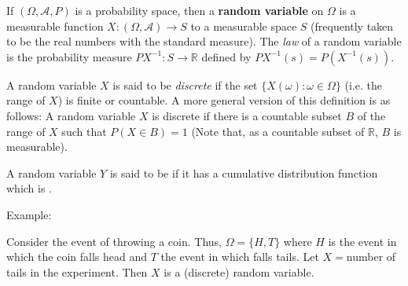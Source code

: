 \documentclass{article}
\newcommand{\mc}{\mathcal}
\newcommand{\mb}{\mathbb}
\newcommand{\R}{\mb{R}}
\newcommand{\<}{\langle}
\renewcommand{\>}{\rangle}
\begin{document}
If $(\Omega,\mc{A},P)$ is a probability space, then a \textbf{random variable} on $\Omega$ is a measurable function $X: (\Omega,\mc{A}) \to S$ to a measurable space $S$ (frequently taken to be the real numbers with the standard measure).  The \emph{law} of a random variable is the probability measure $PX^{-1}:S\to \R$ defined by $PX^{-1}(s)=P(X^{-1}(s))$.

A random variable $X$ is said to be \emph{discrete} if the set $ \{X(\omega) : \omega \in \Omega \}$ (i.e. the range of $X$) is finite or countable.  A more general version of this definition is as follows:  A random variable $X$ is discrete if there is a countable subset $B$ of the range of $X$  such that $P(X \in B)=1$ (Note that, as a countable subset of $\mathbb{R}$, $B$ is measurable).

A random variable $Y$ is said to be \emph{} if it has a cumulative distribution function which is .

Example:

Consider the event of throwing a coin. Thus, $\Omega = \{ H, T \}$ where $H$ is the event in which the coin falls head and $T$ the event in which falls tails.
Let $X=$number of tails in the experiment. Then $X$ is a (discrete) random variable.
\end{document}
